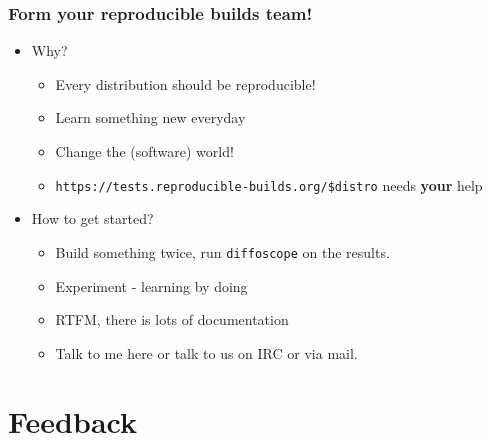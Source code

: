\documentclass[14pt,aspectratio=169]{beamer}
\newif\ifplacelogo
\begin{document}
\begin{frame}
 \frametitle{Form your reproducible builds team!}
 \begin{itemize}
  \item Why?
   \begin{itemize}
    \item Every distribution should be reproducible!
    \item Learn something new everyday
    \item Change the (software) world!
    \item \texttt{https://tests.reproducible-builds.org/\$distro} needs \textbf{your} help
   \end{itemize}
  \item How to get started?
   \begin{itemize}
    \item Build something twice, run \texttt{diffoscope} on the results.
    \item Experiment - learning by doing
    \item RTFM, there is lots of documentation
    \item Talk to me here or talk to us on IRC or via mail.
   \end{itemize}
 \end{itemize}
\end{frame}

\section{Feedback}

\placelogotrue
\end{document}
